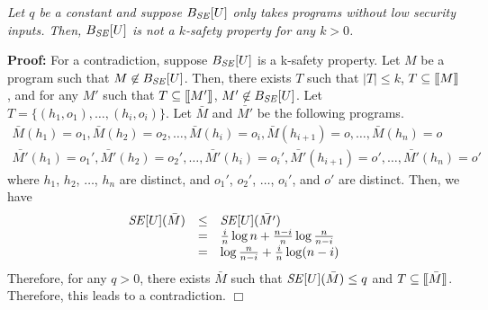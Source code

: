 \documentclass{llncs}
\newenvironment{proof}{\noindent\rm{\bf Proof:}}{\hbox{$\Box$}\vspace*{0.2\baselineskip}}
\newenvironment{reftheorem}[1]{\begin{trivlist}\item[\hskip
      \labelsep{\bf Theorem #1.}]\it}{\end{trivlist}}
\newcommand{\aset}[1]{\{{#1}\}}
\newcommand{\sembrack}[1]{[\hspace*{-1.2pt}[#1]\hspace*{-1.2pt}]}
\begin{document}
\begin{reftheorem}{\ref{thm:senk}}
  Let $q$ be a constant and suppose $B_{\it SE}[U]$ only takes
  programs without low security inputs. Then, $B_{\it SE}[U]$ is not a
  $k$-safety property for any $k > 0$.
\end{reftheorem}
\begin{proof}
  For a contradiction, suppose $B_{\it SE}[U]$ is a k-safety property.
  Let $M$ be a program such that $M\not\in B_{\it SE}[U]$.  Then,
  there exists $T$ such that $|T|\le k$, $T\subseteq\sembrack{M}$, and
  for any $M'$ such that $T\subseteq \sembrack{M'}$, $M'\not\in B_{\it
  SE}[U]$.  Let $T=\aset{(h_1,o_1),\dots,(h_i,o_i)}$.  Let $\bar{M}$
  and $\bar{M'}$ be the following programs.
\[
\begin{array}{l}
  \bar{M}(h_1)=o_1,\bar{M}(h_2)=o_2,\dots,\bar{M}(h_i)=o_i,\bar{M}(h_{i+1})=o,\dots,\bar{M}(h_n)=o\\
  \bar{M'}(h_1)=o_1',\bar{M'}(h_2)=o_2',\dots,\bar{M'}(h_i)=o_i',\bar{M'}(h_{i+1})=o',\dots,\bar{M'}(h_n)=o'
\end{array}
\]
where $h_1$, $h_2$, $\dots$, $h_n$ are distinct, and $o_1'$, $o_2'$,
$\dots$, $o_i'$, and $o'$ are distinct.  Then, we have
\[
\begin{array}{rcl}
{\it SE}[U](\bar{M})&\le& {\it SE}[U](\bar{M'})\\
&=&\frac{i}{n}\log n + \frac{n-i}{n}\log\frac{n}{n-i}\\
&=&\log\frac{n}{n-i}+\frac{i}{n}\log(n-i)
\end{array}
\]
Therefore, for any $q > 0$, there exists $\bar{M}$ such that ${\it
SE}[U](\bar{M}) \leq q$ and $T\subseteq\sembrack{\bar{M}}$.
Therefore, this leads to a contradiction.
\end{proof}
\end{document}
